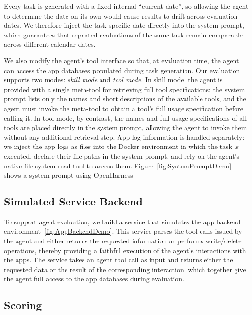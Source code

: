\documentclass{article}
\begin{document}
Every task is generated with a fixed internal ``current date'', so allowing the agent to determine the date on its own would cause results to drift across evaluation dates. We therefore inject the task-specific date directly into the system prompt, which guarantees that repeated evaluations of the same task remain comparable across different calendar dates.

We also modify the agent's tool interface so that, at evaluation time, the agent can access the app databases populated during task generation. Our evaluation supports two modes: \emph{skill mode} and \emph{tool mode}. In skill mode, the agent is provided with a single meta-tool for retrieving full tool specifications; the system prompt lists only the names and short descriptions of the available tools, and the agent must invoke the meta-tool to obtain a tool's full usage specification before calling it. In tool mode, by contrast, the names and full usage specifications of all tools are placed directly in the system prompt, allowing the agent to invoke them without any additional retrieval step. App log information is handled separately: we inject the app logs as files into the Docker environment in which the task is executed, declare their file paths in the system prompt, and rely on the agent's native file-system read tool to access them. Figure~\ref{fig:SystemPromptDemo} shows a system prompt using OpenHarness.

\subsection{Simulated Service Backend}

To support agent evaluation, we build a service that simulates the app backend environment~\ref{fig:AppBackendDemo}. This service parses the tool calls issued by the agent and either returns the requested information or performs write/delete operations, thereby providing a faithful execution of the agent's interactions with the apps. The service takes an agent tool call as input and returns either the requested data or the result of the corresponding interaction, which together give the agent full access to the app databases during evaluation.

\subsection{Scoring}
\end{document}
